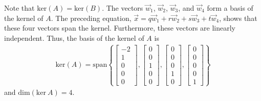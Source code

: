 \documentclass[letterpaper,12pt]{article}
\begin{document}
\begin{enumerate}
    Note that $\text{ker}(A) = \text{ker}(B)$. The vectors $\vec{w}_1$, $\vec{w}_2$, $\vec{w}_3$, and $\vec{w}_4$ form a basis of the kernel of $A$. The preceding equation, $\vec{x} = q\vec{w}_1 + r\vec{w}_2 + s\vec{w}_3 + t\vec{w}_4$, shows that these four vectors span the kernel. Furthermore, these vectors are linearly independent. Thus, the basis of the kernel of $A$ is
    \begin{align*}
      \text{ker}(A) = \text{span}\left\{
        \begin{bmatrix}
          -2 \\ 1 \\ 0 \\ 0 \\ 0
        \end{bmatrix},
        \begin{bmatrix}
          0 \\ 0 \\ 1 \\ 0 \\ 0
        \end{bmatrix},
        \begin{bmatrix}
          0 \\ 0 \\ 0 \\ 1 \\ 0
        \end{bmatrix},
        \begin{bmatrix}
          0 \\ 0 \\ 0 \\ 0 \\ 1
        \end{bmatrix}
      \right\}
    \end{align*}
    and $\text{dim}(\text{ker} \ A) = 4$.


\end{enumerate}
\end{document}
